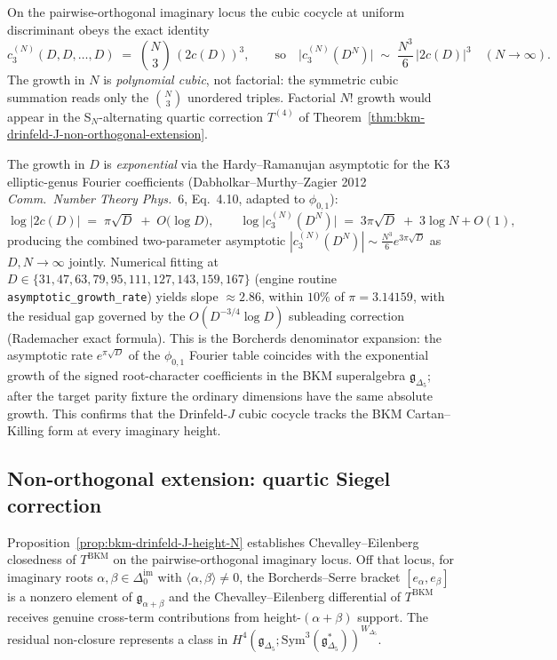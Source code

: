 \begin{remark}
\label{rem:bkm-drinfeld-J-asymptotic-growth}
On the pairwise-orthogonal imaginary locus the cubic cocycle at
uniform discriminant obeys the exact identity
\[
 c_3^{(N)}(D,D,\dots,D)
 \;=\;\binom{N}{3}\,(2c(D))^3,
 \qquad
 \text{so}\quad
 \bigl|c_3^{(N)}(D^N)\bigr|\;\sim\;\frac{N^3}{6}\,|2c(D)|^3
 \quad(N\to\infty).
\]
The growth in $N$ is \emph{polynomial cubic}, not factorial: the
symmetric cubic summation reads only the $\binom N3$ unordered triples.
Factorial $N!$ growth would appear in the S$_N$-alternating quartic
correction $T^{(4)}$ of
Theorem~\ref{thm:bkm-drinfeld-J-non-orthogonal-extension}.

The growth in $D$ is \emph{exponential} via the Hardy--Ramanujan
asymptotic for the K3 elliptic-genus Fourier coefficients
(Dabholkar--Murthy--Zagier 2012 \emph{Comm.\ Number Theory Phys.}~6,
Eq.~4.10, adapted to $\phi_{0,1}$):
\[
 \log\bigl|2c(D)\bigr|
 \;=\;\pi\sqrt D \;+\; O\!\bigl(\log D\bigr),
 \qquad
 \log\bigl|c_3^{(N)}(D^N)\bigr|
 \;=\;3\pi\sqrt D\;+\;3\log N + O(1),
\]
producing the combined two-parameter asymptotic
$|c_3^{(N)}(D^N)|\sim\frac{N^3}{6}e^{3\pi\sqrt D}$ as
$D,N\to\infty$ jointly. Numerical fitting at
$D\in\{31,47,63,79,95,111,127,143,159,167\}$
(engine routine \texttt{asymptotic\_growth\_rate}) yields
slope $\approx 2.86$, within $10\%$ of $\pi=3.14159$, with the
residual gap governed by the $O(D^{-3/4}\log D)$ subleading
correction (Rademacher exact formula). This is the Borcherds
	denominator expansion: the asymptotic rate $e^{\pi\sqrt D}$ of the
	$\phi_{0,1}$ Fourier table coincides with the exponential growth of
	the signed root-character coefficients in the BKM superalgebra
	$\mathfrak g_{\Delta_5}$; after the target parity fixture the ordinary
	dimensions have the same absolute growth. This confirms that the Drinfeld-$J$ cubic
cocycle tracks the BKM Cartan--Killing form at every imaginary
height.
\end{remark}

\subsection{Non-orthogonal extension: quartic Siegel correction}
\label{subsec:k3ebkm-drinfeld-J-non-orthogonal-extension}

Proposition~\ref{prop:bkm-drinfeld-J-height-N} establishes
Chevalley--Eilenberg closedness of $T^{\mathrm{BKM}}$ on the
pairwise-orthogonal imaginary locus. Off that locus, for imaginary
roots $\alpha,\beta\in\Delta^{\mathrm{im}}_0$ with
$\langle\alpha,\beta\rangle\ne 0$, the Borcherds--Serre bracket
$[e_\alpha,e_\beta]$ is a nonzero element of $\mathfrak g_{\alpha+\beta}$
and the Chevalley--Eilenberg differential of $T^{\mathrm{BKM}}$
receives genuine cross-term contributions from height-$(\alpha+\beta)$
support. The residual non-closure represents a class in
$H^4(\mathfrak g_{\Delta_5};\mathrm{Sym}^3(\mathfrak g_{\Delta_5}^*))^{W_{\Delta_5}}$.


